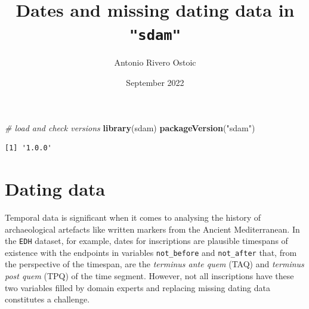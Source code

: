\documentclass[a4paper,11pt]{memoir}
\title{Dates and missing dating data in \texttt{"sdam"}}
\author{Antonio Rivero Ostoic}
\date{September 2022}
\newenvironment{Shaded}{\begin{snugshade}}{\end{snugshade}}
\newcommand{\CommentTok}[1]{\textcolor[rgb]{0.56,0.35,0.01}{\textit{#1}}}
\newcommand{\DataTypeTok}[1]{\textcolor[rgb]{0.13,0.29,0.53}{#1}}
\newcommand{\KeywordTok}[1]{\textcolor[rgb]{0.13,0.29,0.53}{\textbf{#1}}}
\newcommand{\NormalTok}[1]{#1}
\newcommand{\OperatorTok}[1]{\textcolor[rgb]{0.81,0.36,0.00}{\textbf{#1}}}
\newcommand{\StringTok}[1]{\textcolor[rgb]{0.31,0.60,0.02}{#1}}
\begin{document}
\maketitle

%   
%   

\begin{Shaded}
\begin{Highlighting}[]
\CommentTok{# load and check versions}
\KeywordTok{library}\NormalTok{(sdam)}
\KeywordTok{packageVersion}\NormalTok{(}\StringTok{"sdam"}\NormalTok{)}
\end{Highlighting}
\end{Shaded}

\begin{verbatim}
[1] '1.0.0'
\end{verbatim}

\hypertarget{dating-data}{%
\section{Dating data}\label{dating-data}}

Temporal data is significant when it comes to analysing the history of
archaeological artefacts like written markers from the Ancient
Mediterranean. In the \texttt{EDH} dataset, for example, dates for
inscriptions are plausible timespans of existence with the endpoints in
variables \texttt{not\_before} and \texttt{not\_after} that, from the
perspective of the timespan, are the \emph{terminus ante quem} (TAQ) and
\emph{terminus post quem} (TPQ) of the time segment. However, not all
inscriptions have these two variables filled by domain experts and
replacing missing dating data constitutes a challenge.
\end{document}

